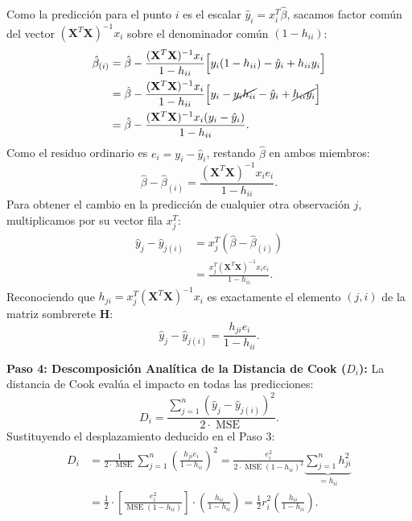\documentclass[11pt,a4paper]{article}
\begin{document}
\begin{demobox}
\begin{align}
\end{align}
Como la predicción para el punto $i$ es el escalar $\hat{y}_i = x_i^T \hat{\beta}$, sacamos factor común del vector $(\mathbf{X}^T \mathbf{X})^{-1} x_i$ sobre el denominador común $(1 - h_{ii})$:
\begin{align}
\hat{\beta}_{(i)} &= \hat{\beta} - \frac{(\mathbf{X}^T \mathbf{X})^{-1} x_i}{1 - h_{ii}} \Big[ y_i(1 - h_{ii}) - \hat{y}_i + h_{ii} y_i \Big] \\
&= \hat{\beta} - \frac{(\mathbf{X}^T \mathbf{X})^{-1} x_i}{1 - h_{ii}} \Big[ y_i - \cancel{y_i h_{ii}} - \hat{y}_i + \cancel{h_{ii} y_i} \Big] \\
&= \hat{\beta} - \frac{(\mathbf{X}^T \mathbf{X})^{-1} x_i (y_i - \hat{y}_i)}{1 - h_{ii}}.
\end{align}
Como el residuo ordinario es $e_i = y_i - \hat{y}_i$, restando $\hat{\beta}$ en ambos miembros:
\begin{equation}
\hat{\beta} - \hat{\beta}_{(i)} = \frac{(\mathbf{X}^T \mathbf{X})^{-1} x_i e_i}{1 - h_{ii}}.
\end{equation}
Para obtener el cambio en la predicción de cualquier otra observación $j$, multiplicamos por su vector fila $x_j^T$:
\begin{align}
\hat{y}_j - \hat{y}_{j(i)} &= x_j^T (\hat{\beta} - \hat{\beta}_{(i)}) \\
&= \frac{x_j^T (\mathbf{X}^T \mathbf{X})^{-1} x_i e_i}{1 - h_{ii}}.
\end{align}
Reconociendo que $h_{ji} = x_j^T (\mathbf{X}^T \mathbf{X})^{-1} x_i$ es exactamente el elemento $(j, i)$ de la matriz sombrerete $\mathbf{H}$:
\begin{equation}
\hat{y}_j - \hat{y}_{j(i)} = \frac{h_{ji} e_i}{1 - h_{ii}}.
\end{equation}

\textbf{Paso 4: Descomposición Analítica de la Distancia de Cook ($D_i$):}  
La distancia de Cook evalúa el impacto en todas las predicciones:
\begin{equation}
D_i = \frac{\sum_{j=1}^n (\hat{y}_j - \hat{y}_{j(i)})^2}{2 \cdot \operatorname{MSE}}.
\end{equation}
Sustituyendo el desplazamiento deducido en el Paso 3:
\begin{align}
D_i &= \frac{1}{2 \cdot \operatorname{MSE}} \sum_{j=1}^n \left( \frac{h_{ji} e_i}{1 - h_{ii}} \right)^2 = \frac{e_i^2}{2 \cdot \operatorname{MSE}(1 - h_{ii})^2} \underbrace{\sum_{j=1}^n h_{ji}^2}_{= h_{ii}} \\
&= \frac{1}{2} \cdot \left[ \frac{e_i^2}{\operatorname{MSE}(1 - h_{ii})} \right] \cdot \left( \frac{h_{ii}}{1 - h_{ii}} \right) = \frac{1}{2} r_i^2 \left( \frac{h_{ii}}{1 - h_{ii}} \right).
\end{align}


\end{demobox}
\end{document}
